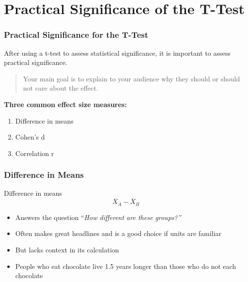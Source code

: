 \documentclass[12pt, block=fill]{beamer}
\begin{document}




\section{Practical Significance of the T-Test}
\begin{frame}
  \frametitle{Practical Significance for the T-Test}

  After using a t-test to assess statistical significance, it is
  important to assess practical significance. \\ \vspace{1em}

  \begin{quote}
    Your main goal is to explain to your audience
    why they should or should not care about the effect.
  \end{quote}

  \textbf{Three common effect size measures:}

  \begin{enumerate}
  \item Difference in means
  \item Cohen's d
  \item Correlation r
  \end{enumerate}
\end{frame}

\begin{frame}
  \frametitle{Difference in Means}

  \begin{block}{Difference in means}
    \[
      \overline{X}_{A} - \overline{X}_{B}
    \]
  \end{block}
    \begin{itemize}
    \item Answers the question ``\textit{How different are these
        groups?''}
    \item Often makes great headlines
      and is a good choice if units are familiar
    \item But lacks context in its calculation
  \item People who eat chocolate live 1.5 years longer than those who
    do not each chocolate
  \end{itemize}
\end{frame}
\end{document}
